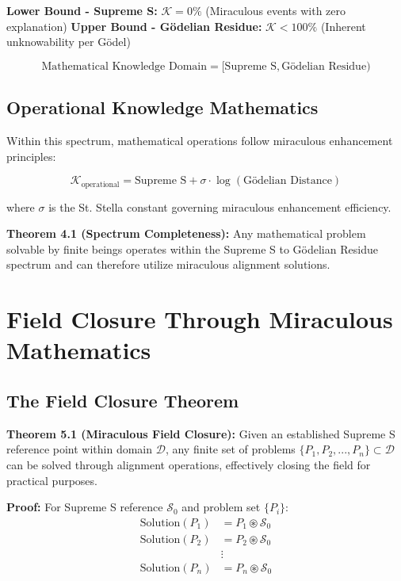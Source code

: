 \documentclass[11pt]{article}
\begin{document}
\textbf{Lower Bound - Supreme S:} $\mathcal{K} = 0\%$ (Miraculous events with zero explanation)
\textbf{Upper Bound - Gödelian Residue:} $\mathcal{K} < 100\%$ (Inherent unknowability per Gödel)

\begin{equation}
\text{Mathematical Knowledge Domain} = [\text{Supreme S}, \text{Gödelian Residue})
\label{eq:knowledge_spectrum}
\end{equation}

\subsection{Operational Knowledge Mathematics}

Within this spectrum, mathematical operations follow miraculous enhancement principles:

\begin{equation}
\mathcal{K}_{\text{operational}} = \text{Supreme S} + \sigma \cdot \log(\text{Gödelian Distance})
\label{eq:operational_knowledge}
\end{equation}

where $\sigma$ is the St. Stella constant governing miraculous enhancement efficiency.

\textbf{Theorem 4.1 (Spectrum Completeness):} Any mathematical problem solvable by finite beings operates within the Supreme S to Gödelian Residue spectrum and can therefore utilize miraculous alignment solutions.

\section{Field Closure Through Miraculous Mathematics}

\subsection{The Field Closure Theorem}

\textbf{Theorem 5.1 (Miraculous Field Closure):} Given an established Supreme S reference point within domain $\mathcal{D}$, any finite set of problems $\{P_1, P_2, ..., P_n\} \subset \mathcal{D}$ can be solved through alignment operations, effectively closing the field for practical purposes.

\textbf{Proof:} 
For Supreme S reference $\mathcal{S}_0$ and problem set $\{P_i\}$:
\begin{align}
\text{Solution}(P_1) &= P_1 \circledast \mathcal{S}_0 \\
\text{Solution}(P_2) &= P_2 \circledast \mathcal{S}_0 \\
&\vdots \\
\text{Solution}(P_n) &= P_n \circledast \mathcal{S}_0
\label{eq:field_closure}
\end{align}
\end{document}
